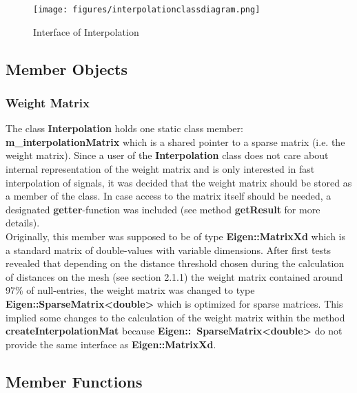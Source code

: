 \begin{figure}[h]
	\begin{center}
		\texttt{[image: figures/interpolationclassdiagram.png]}
		\caption{Interface of Interpolation}
	\end{center}
\end{figure}

\subsection{Member Objects}

\subsubsection{Weight Matrix}
The class \textbf{Interpolation} holds one static class member: \textbf{m\_interpolationMatrix} which is a shared pointer to a sparse matrix (i.e. the weight matrix). Since a user of the \textbf{Interpolation} class does not care about internal representation of the weight matrix and is only interested in fast interpolation of signals, it was decided that the weight matrix should be stored as a member of the class. In case access to the matrix itself should be needed, a designated \textbf{getter}-function was included (see method \textbf{getResult} for more details).\\
Originally, this member was supposed to be of type \textbf{Eigen::MatrixXd} which is a standard matrix of double-values with variable dimensions. After first tests revealed that depending on the distance threshold chosen during the calculation of distances on the mesh (see section 2.1.1) the weight matrix contained around 97\% of null-entries, the weight matrix was changed to type\\ \textbf{Eigen::SparseMatrix<double>} which is optimized for sparse matrices. This implied some changes to the calculation of the weight matrix within the method \textbf{createInterpolationMat} because \textbf{Eigen::\ SparseMatrix<double>} do not provide the same interface as \textbf{Eigen::MatrixXd}.

\subsection{Member Functions}


